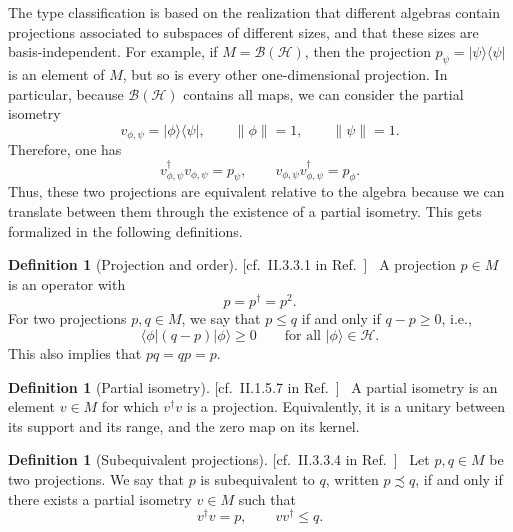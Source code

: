 \documentclass[aps,pra,reprint,superscriptaddress]{revtex4-2}
\newcommand{\cB}{{\mathcal B}}
\newcommand{\cH}{{\mathcal H}}
\newcommand\p{\phi}
\newcommand\y{\psi}
\providecommand{\ket}[1]{\lvert #1\rangle}
\providecommand{\bra}[1]{\langle #1\rvert}
\providecommand{\norm}[1]{\lVert #1\rVert}
\newcommand{\thmref}[1]{\textnormal{[#1]}\ }
\theoremstyle{definition}
\newtheorem{definition}[theorem]{Definition}
\theoremstyle{remark}
\begin{document}
The type classification is based on the realization that different algebras
contain projections associated to subspaces of different sizes, and that these
sizes are basis-independent. For example, if $M=\cB(\cH)$, then
the projection $p_\y=\ket{\y}\bra{\y}$ is an element of $M$, but so is every
other one-dimensional projection. In particular, because $\cB(\cH)$ contains
all maps, we can consider the partial isometry
\begin{equation}
    v_{\p,\y}=\ket{\p}\bra{\y},
    \qquad
    \norm{\p}=1,
    \qquad
    \norm{\y}=1.
\end{equation}
Therefore, one has
\begin{equation}
    v_{\p,\y}^\dagger v_{\p,\y}=p_\y,
    \qquad
    v_{\p,\y}v_{\p,\y}^\dagger=p_\p.
\end{equation}
Thus, these two projections are equivalent relative to the algebra because we
can translate between them through the existence of a partial isometry. This
gets formalized in the following definitions.

\begin{definition}[Projection and order]
\thmref{cf.~II.3.3.1 in Ref.~\cite{Blackadar}}
A projection $p\in M$ is an operator with
\begin{equation}
    p=p^\dagger=p^2.
\end{equation}
For two projections $p,q\in M$, we say that $p\leq q$ if and only if $q-p\geq
0$, i.e.,
\begin{equation}
    \bra{\p}(q-p)\ket{\p}\geq 0
    \qquad\text{for all }\ket{\p}\in\cH.
\end{equation}
This also implies that $pq=qp=p$.
\end{definition}

\begin{definition}[Partial isometry]
\thmref{cf.~II.1.5.7 in Ref.~\cite{Blackadar}}
A partial isometry is an element $v\in M$ for which $v^\dagger v$ is a
projection. Equivalently, it is a unitary between its support and its range,
and the zero map on its kernel.
\end{definition}

\begin{definition}[Subequivalent projections]
\thmref{cf.~II.3.3.4 in Ref.~\cite{Blackadar}}
Let $p,q\in M$ be two projections. We say that $p$ is subequivalent to $q$,
written $p\precsim q$, if and only if there exists a partial isometry $v\in M$
such that
\begin{equation}
    v^\dagger v=p,
    \qquad
    vv^\dagger\leq q.
\end{equation}
\end{definition}
\end{document}
